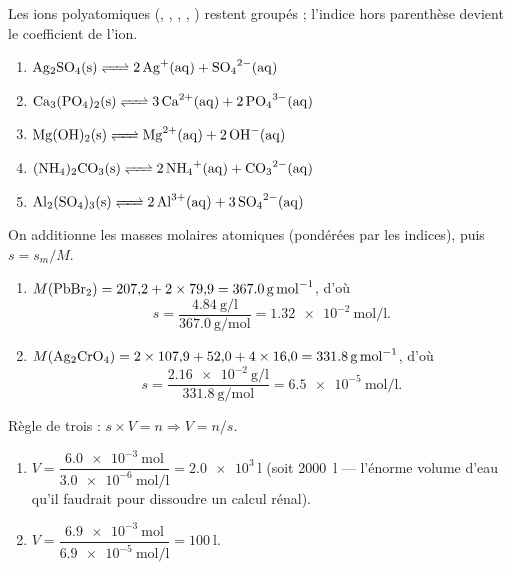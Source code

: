 \documentclass[11pt,a4paper]{article}
\begin{document}
\begin{corrige}
Les ions polyatomiques (, , , , ) restent
groupés ; l'indice hors parenthèse devient le coefficient de l'ion.
\begin{enumerate}[label=\alph*)]
  \item $\ce{Ag2SO4(s) <=> 2 Ag^{+}(aq) + SO4^{2-}(aq)}$
  \item $\ce{Ca3(PO4)2(s) <=> 3 Ca^{2+}(aq) + 2 PO4^{3-}(aq)}$
  \item $\ce{Mg(OH)2(s) <=> Mg^{2+}(aq) + 2 OH^{-}(aq)}$
  \item $\ce{(NH4)2CO3(s) <=> 2 NH4^{+}(aq) + CO3^{2-}(aq)}$
  \item $\ce{Al2(SO4)3(s) <=> 2 Al^{3+}(aq) + 3 SO4^{2-}(aq)}$
\end{enumerate}
\end{corrige}

\begin{corrige}
On additionne les masses molaires atomiques (pondérées par les indices), puis $s=s_m/M$.
\begin{enumerate}[label=\alph*)]
  \item $M(\ce{PbBr2}) = 207{,}2 + 2\times 79{,}9 = \qty{367.0}{\gram\per\mole}$, d'où
        \[ s = \dfrac{\qty{4.84}{\gram\per\litre}}{\qty{367.0}{\gram\per\mole}} = \qty{1.32e-2}{\mole\per\litre}. \]
  \item $M(\ce{Ag2CrO4}) = 2\times 107{,}9 + 52{,}0 + 4\times 16{,}0 = \qty{331.8}{\gram\per\mole}$, d'où
        \[ s = \dfrac{\qty{2.16e-2}{\gram\per\litre}}{\qty{331.8}{\gram\per\mole}} = \qty{6.5e-5}{\mole\per\litre}. \]
\end{enumerate}
\end{corrige}

\begin{corrige}
Règle de trois : $s\times V = n \Rightarrow V = n/s$.
\begin{enumerate}[label=\alph*)]
  \item $V = \dfrac{\qty{6.0e-3}{\mole}}{\qty{3.0e-6}{\mole\per\litre}} = \qty{2.0e3}{\litre}$
        (soit \qty{2000}{\litre} — l'énorme volume d'eau qu'il faudrait pour dissoudre un calcul rénal).
  \item $V = \dfrac{\qty{6.9e-3}{\mole}}{\qty{6.9e-5}{\mole\per\litre}} = \qty{100}{\litre}$.
\end{enumerate}
\end{corrige}
\end{document}
